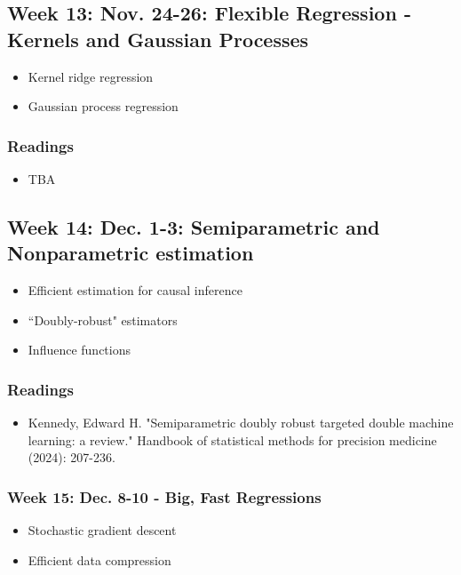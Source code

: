 \documentclass[11pt, article, oneside]{memoir}
\theoremstyle{Assumption}
\begin{document}
\subsection{Week 13: Nov. 24-26: Flexible Regression - Kernels and Gaussian Processes}

\begin{itemize}
\item Kernel ridge regression
\item Gaussian process regression
\end{itemize}

\subsubsection*{Readings}

\begin{itemize}
\item TBA
\end{itemize}

\subsection{Week 14: Dec. 1-3: Semiparametric and Nonparametric estimation}

\begin{itemize}
\item Efficient estimation for causal inference
\item ``Doubly-robust" estimators
\item Influence functions
\end{itemize}

\subsubsection*{Readings}

\begin{itemize}
\item Kennedy, Edward H. "Semiparametric doubly robust targeted double machine learning: a review." Handbook of statistical methods for precision medicine (2024): 207-236.
\end{itemize}

\subsubsection{Week 15: Dec. 8-10 - Big, Fast Regressions}

\begin{itemize}
\item Stochastic gradient descent
\item Efficient data compression
\end{itemize}
\end{document}
